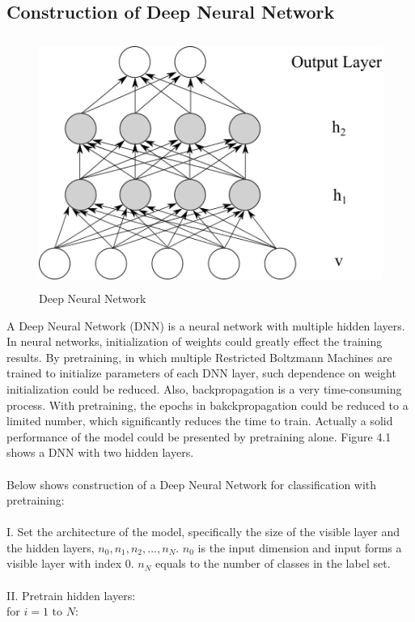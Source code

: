 \documentclass[12pt]{article}
\begin{document}
\subsection{Construction of Deep Neural Network}
\begin{figure}[h]
\centering
\includegraphics[height=3.2in]{DNN.png}
\caption{Deep Neural Network} \label{fig:side:a}
\end{figure}
A Deep Neural Network (DNN) is a neural network with multiple hidden layers. In neural networks, initialization of weights could greatly effect the training results. By pretraining, in which multiple Restricted Boltzmann Machines are trained to initialize parameters of each DNN layer, such dependence on weight initialization could be reduced. Also, backpropagation is a very time-consuming process. With pretraining, the epochs in bakckpropagation could be reduced to a limited number, which significantly reduces the time to train. Actually a solid performance of the model could be presented by pretraining alone. Figure 4.1 shows a DNN with two hidden layers.\\
\\
Below shows construction of a Deep Neural Network for classification with pretraining:\\
\\
I. Set the architecture of the model, specifically the size of the visible layer and the hidden layers, \(n_0, n_1, n_2, ..., n_N\). $n_0$ is the input dimension and input forms a visible layer with index 0. $n_N$ equals to the number of classes in the label set.\\
\\
II. Pretrain hidden layers:\\
for $i = 1\text{ to }N $:\\
\end{document}

